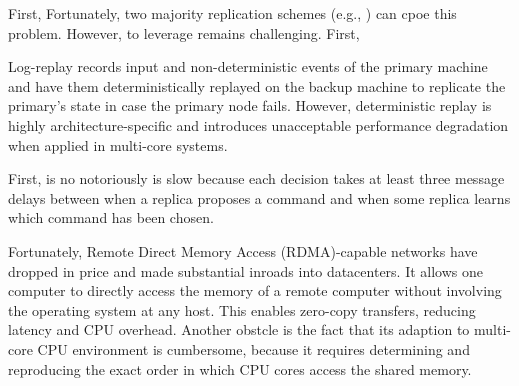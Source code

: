 First, 
Fortunately, two majority replication schemes (e.g., \paxos) can cpoe this problem. However, to 
leverage \paxos remains challenging. First, 




Log-replay records input and non-deterministic events of the primary machine and have them 
deterministically replayed on the backup machine to replicate the primary's state in case 
the primary node fails. However, deterministic replay is highly architecture-specific and 
introduces unacceptable performance degradation when applied in multi-core systems.



First, \paxos is no notoriously is slow because each decision takes at least three message delays 
between when a replica proposes a command and when some replica learns which command has been chosen.

Fortunately, Remote Direct Memory Access (RDMA)-capable networks have dropped in price and made 
substantial inroads into datacenters. It allows one computer to directly access the memory of 
a remote computer without involving the operating system at any host. This enables zero-copy 
transfers, reducing latency and CPU overhead.
Another obstcle is the fact that its adaption to multi-core CPU environment is cumbersome, because 
it requires determining and reproducing the exact order in which CPU cores access the shared memory.

